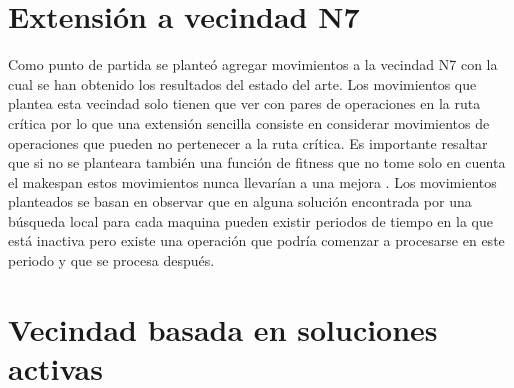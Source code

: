 \section{Extensión a vecindad N7}
Como punto de partida se planteó agregar movimientos a la vecindad N7 con la cual se han obtenido los resultados del estado del arte.
Los movimientos que plantea esta vecindad solo tienen que ver con pares de operaciones en la ruta crítica por lo que una extensión sencilla consiste en considerar movimientos de operaciones que pueden no pertenecer a la ruta crítica. Es importante resaltar que si no se planteara también una función de fitness que no tome solo en cuenta el makespan estos movimientos nunca llevarían a una mejora \cite{blazewicz1996job}. 
Los movimientos planteados se basan en observar que en alguna solución encontrada por una búsqueda local para cada maquina pueden existir periodos de tiempo en la que está inactiva pero existe una operación que podría comenzar a procesarse en este periodo y que se procesa después.


\section{Vecindad basada en soluciones activas}

